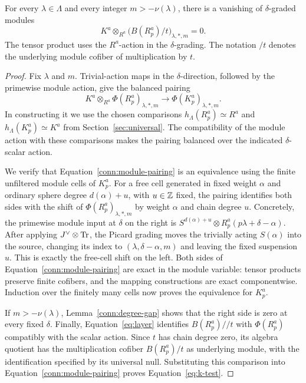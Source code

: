 \begin{proposition}\label{conn:k-test}
For every $\lambda\in\Lambda$ and every integer
$m>-\nu(\lambda)$, there is a vanishing of
$\delta$-graded modules
\begin{equation}\label{eq:k-test}
 K^a\otimes_{R^a}
       \big(B(R_p^a)/t\big)_{\lambda,*,m}=0.
\end{equation}
The tensor product uses the $R^a$-action in the
$\delta$-grading. The notation $/t$ denotes the underlying
module cofiber of multiplication by $t$.
\end{proposition}

\begin{proof}
Fix $\lambda$ and $m$. Trivial-action maps in the
$\delta$-direction, followed by the primewise module action,
give the balanced pairing
\begin{equation}\label{conn:module-pairing}
 K^a\otimes_{R^a}\Phi(R_p^a)_{\lambda,*,m}
 \longrightarrow \Phi(K_p^a)_{\lambda,*,m}.
\end{equation}
In constructing it we use the chosen comparisons
$h_\Lambda(R_p^a)\simeq R^a$ and
$h_\Lambda(K_p^a)\simeq K^a$ from
Section~\ref{sec:universal}. The compatibility of the module
action with these comparisons makes the pairing balanced over
the indicated $\delta$-scalar action.

We verify that Equation~\eqref{conn:module-pairing} is an
equivalence using the finite unfiltered module cells of $K_p^a$.
For a free cell generated in fixed weight $\alpha$ and ordinary
sphere degree $d(\alpha)+u$, with $u\in\mathbb Z$ fixed, the pairing
identifies both sides with the shift of
$\Phi(R_p^a)_{\lambda,*,m}$ by weight $\alpha$ and chain degree
$u$. Concretely, the primewise module input at $\delta$ on the
right is
$S^{d(\alpha)+u}\otimes R_p^a(p\lambda+\delta-\alpha)$.
After applying $J^\vee\otimes\operatorname{Tr}$, the Picard grading moves
the trivially acting $S(\alpha)$ into the source, changing its index to
$(\lambda,\delta-\alpha,m)$ and leaving the fixed suspension
$u$. This is exactly the free-cell shift on the left.
Both sides of Equation~\eqref{conn:module-pairing} are exact in
the module variable: tensor products preserve finite cofibers,
and the mapping constructions are exact componentwise.
Induction over the finitely many cells now proves the
equivalence for $K_p^a$.

If $m>-\nu(\lambda)$, Lemma~\ref{conn:degree-gap} shows that
the right side is zero at every fixed $\delta$. Finally,
Equation~\eqref{eq:layer} identifies
$B(R_p^a)//t$ with $\Phi(R_p^a)$ compatibly with the scalar
action. Since $t$ has chain degree zero, its algebra quotient
has the multiplication cofiber $B(R_p^a)/t$ as underlying
module, with the identification specified by its universal
null. Substituting this comparison into
Equation~\eqref{conn:module-pairing} proves
Equation~\eqref{eq:k-test}.
\end{proof}

